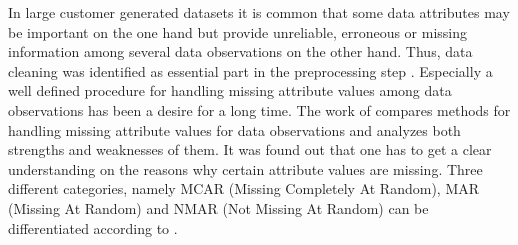 In large customer generated datasets it is common that some data attributes may be important on the one hand but provide unreliable, erroneous or missing information among several data observations on the other hand. Thus, data cleaning was identified as essential part in the preprocessing step \cite{fayyad1996data}. Especially a well defined procedure for handling missing attribute values among data observations has been a desire for a long time. The work of \cite{batista2003analysis} compares methods for handling missing attribute values for data observations and analyzes both strengths and weaknesses of them. It was found out that one has to get a clear understanding on the reasons why certain attribute values are missing. Three different categories, namely MCAR (Missing Completely At Random), MAR (Missing At Random) and NMAR (Not Missing At Random) can be differentiated according to \cite{little2014statistical}. 

